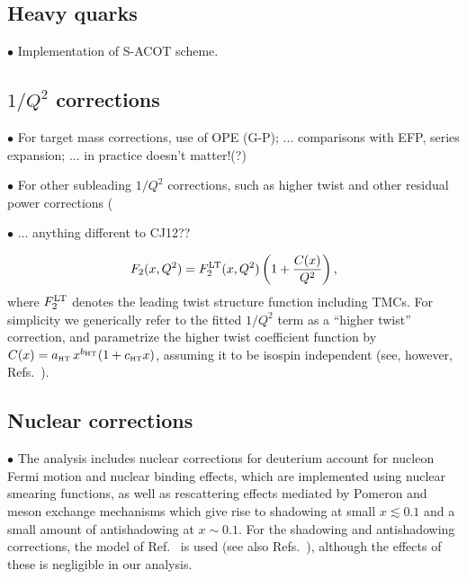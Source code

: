 \documentclass[aps,prd,amsmath,preprint]{revtex4}
\begin{document}
\subsection{Heavy quarks}
\label{ssec:HQs}

$\bullet$
Implementation of S-ACOT scheme.



\subsection{$1/Q^2$ corrections}
\label{ssec:power}

$\bullet$
For target mass corrections, use of OPE (G-P);
... comparisons with EFP, series expansion;
... in practice doesn't matter!(?)


$\bullet$
For other subleading $1/Q^2$ corrections, such as higher twist and
other residual power corrections (


$\bullet$
... anything different to CJ12??


%
\begin{align}
F_2(x,Q^2)
= F_2^{\rm LT}(x,Q^2)
  \left( 1 + \frac{C(x)}{Q^2} \right),
\label{eq:F2ht}
\end{align}
%
where $F_2^{\rm LT}$ denotes the leading twist structure function
including TMCs.  For simplicity we generically refer to the fitted
$1/Q^2$ term as a ``higher twist'' correction, and parametrize the
higher twist coefficient function by
%
$C(x) = a_{\rm {\scriptscriptstyle HT}}\,
	x^{b_{\rm {\scriptscriptstyle HT}}}
	(1+c_{\rm {\scriptscriptstyle HT}} x)$,
%
assuming it to be isospin independent
(see, however, Refs.~\cite{Vir92, AKL03, BB08, Blu12}).


\subsection{Nuclear corrections}
\label{ssec:nuclear}


$\bullet$
The analysis includes nuclear corrections for deuterium account for
nucleon Fermi motion and nuclear binding effects, which are implemented
using nuclear smearing functions, as well as rescattering effects
mediated by Pomeron and meson exchange mechanisms which give rise to
shadowing at small $x \lesssim 0.1$ and a small amount of antishadowing
at $x \sim 0.1$.
For the shadowing and antishadowing corrections, the model of
Ref.~\cite{MTshad} is used (see also Refs.~\cite{Badelek92, Kaptari91}),
although the effects of these is negligible in our analysis.
\end{document}
